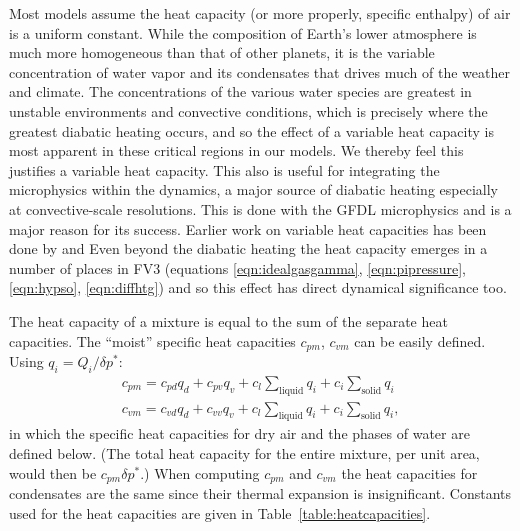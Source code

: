 \documentclass[10pt,letterpaper,margin=1in]{memoir}
\begin{document}
Most models assume the heat capacity (or more properly, specific enthalpy) of air is a uniform constant. While the composition of Earth's lower atmosphere is much more homogeneous than that of other planets, it is the variable concentration of water vapor and its condensates that drives much of the weather and climate. The concentrations of the various water species are greatest in unstable environments and convective conditions, which is precisely where the greatest diabatic heating occurs, and so the effect of a variable heat capacity is most apparent in these critical regions in our models. We thereby feel this justifies a variable heat capacity. This also is useful for integrating the microphysics within the dynamics, a major source of diabatic heating especially at convective-scale resolutions. This is done with the GFDL microphysics \citep{ChenLin2013,Zhou2019,Harris2020} and is a major reason for its success. Earlier work on variable heat capacities has been done by \citet{Ooyama1990} and \citet{Satoh2008} Even beyond the diabatic heating the heat capacity emerges in a number of places in FV3 (equations \eqref{eqn:idealgasgamma}, \eqref{eqn:pipressure}, \eqref{eqn:hypso}, \eqref{eqn:diffhtg}) and so this effect has direct dynamical significance too.


The heat capacity of a mixture is equal to the sum of the separate heat capacities. The ``moist'' specific heat capacities $c_{pm}$, $c_{vm}$ can be easily defined. Using $q_i = Q_i/\delta p^*$:
\begin{equation}
\begin{split}
c_{pm} = c_{pd}q_d + c_{pv}q_v + c_{l}\sum_\text{liquid}q_i + c_{i}\sum_\text{solid}q_i \\
c_{vm} = c_{vd}q_d + c_{vv}q_v + c_{l}\sum_\text{liquid}q_i + c_{i}\sum_\text{solid}q_i,
\end{split}
\end{equation}
in which the specific heat capacities for dry air and the phases of water are defined below.  (The total heat capacity for the entire mixture, per unit area, would then be $c_{pm}\delta p^*$.) When computing $c_{pm}$ and $c_{vm}$ the heat capacities for condensates are the same since their thermal expansion is insignificant. Constants used for the heat capacities are given in Table~\ref{table:heatcapacities}.
\end{document}
